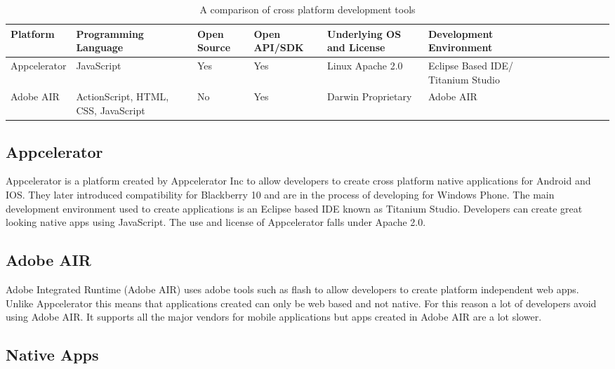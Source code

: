 \begin{table}[!ht]
    \begin{tabular}{|p{2.5cm}|p{2.5cm}|p{2.0cm}|p{2.5cm}|p{2.5cm}|p{2.5cm}|l|l|l|l|l|l|l|}
    \hline
    Platform     & Programming   Language              & Open Source & Open API/SDK & Underlying OS and License & Development   Environment          \\ \hline
    Appcelerator & JavaScript                          & Yes         & Yes  & Linux Apache 2.0        & Eclipse Based IDE/ Titanium Studio \\ \hline
    Adobe AIR    & ActionScript, HTML, CSS, JavaScript & No          & Yes   & Darwin Proprietary       & Adobe AIR                          \\ \hline
    \end{tabular}
     \caption {A comparison of cross platform development tools}
\end{table}

\newpage
\subsection{Appcelerator}

Appcelerator is a platform created by Appcelerator Inc to allow developers to create cross platform native applications for Android and IOS. They later introduced compatibility for Blackberry 10 and are in the process of developing for Windows Phone. The main development environment used to create applications is an Eclipse based IDE known as Titanium Studio. Developers can create great looking native apps using JavaScript. The use and license of Appcelerator falls under Apache 2.0.

\subsection{Adobe AIR}

Adobe Integrated Runtime (Adobe AIR) uses adobe tools such as flash to allow developers to create platform independent web apps. Unlike Appcelerator this means that applications created can only be web based and not native. For this reason a lot of developers avoid using Adobe AIR. It supports all the major vendors for mobile applications but apps created in Adobe AIR are a lot slower.


\newpage
\subsection{Native Apps}

